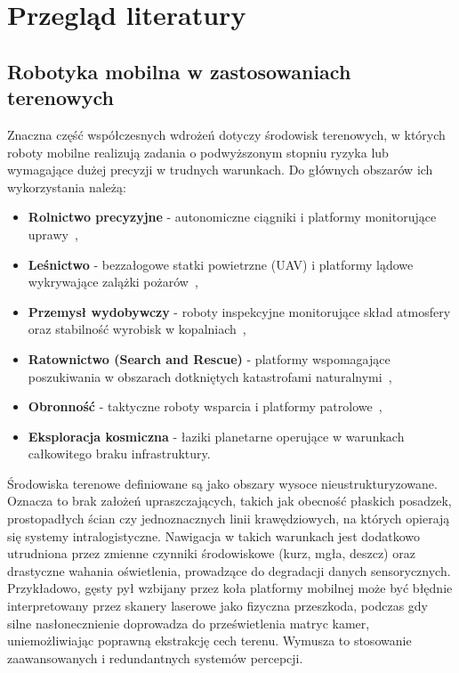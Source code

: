 \documentclass[a4paper,twoside,12pt]{book}
\begin{document}
\chapter{Przegląd literatury}

\section{Robotyka mobilna w zastosowaniach terenowych}
Znaczna część współczesnych wdrożeń dotyczy środowisk terenowych, w których roboty mobilne realizują zadania o podwyższonym stopniu ryzyka lub wymagające dużej precyzji w trudnych warunkach. Do głównych obszarów ich wykorzystania należą:
\begin{itemize}
    \item \textbf{Rolnictwo precyzyjne} - autonomiczne ciągniki i platformy monitorujące uprawy~\cite{machines12040218},
    \item \textbf{Leśnictwo} - bezzałogowe statki powietrzne (UAV) i platformy lądowe wykrywające zalążki pożarów~\cite{f13111952},
    \item \textbf{Przemysł wydobywczy} - roboty inspekcyjne monitorujące skład atmosfery oraz stabilność wyrobisk w kopalniach~\cite{rs13010069},
    \item \textbf{Ratownictwo (Search and Rescue)} - platformy wspomagające poszukiwania w obszarach dotkniętych katastrofami naturalnymi~\cite{DONG2025103457},
    \item \textbf{Obronność} - taktyczne roboty wsparcia i platformy patrolowe~\cite{milit_10239710},
    \item \textbf{Eksploracja kosmiczna} - łaziki planetarne operujące w warunkach całkowitego braku infrastruktury.
\end{itemize}

Środowiska terenowe definiowane są jako obszary wysoce nieustrukturyzowane. Oznacza to brak założeń upraszczających, takich jak obecność płaskich posadzek, prostopadłych ścian czy jednoznacznych linii krawędziowych, na których opierają się systemy intralogistyczne. Nawigacja w takich warunkach jest dodatkowo utrudniona przez zmienne czynniki środowiskowe (kurz, mgła, deszcz) oraz drastyczne wahania oświetlenia, prowadzące do degradacji danych sensorycznych. Przykładowo, gęsty pył wzbijany przez koła platformy mobilnej może być błędnie interpretowany przez skanery laserowe jako fizyczna przeszkoda, podczas gdy silne nasłonecznienie doprowadza do prześwietlenia matryc kamer, uniemożliwiając poprawną ekstrakcję cech terenu. Wymusza to stosowanie zaawansowanych i redundantnych systemów percepcji.
\end{document}
